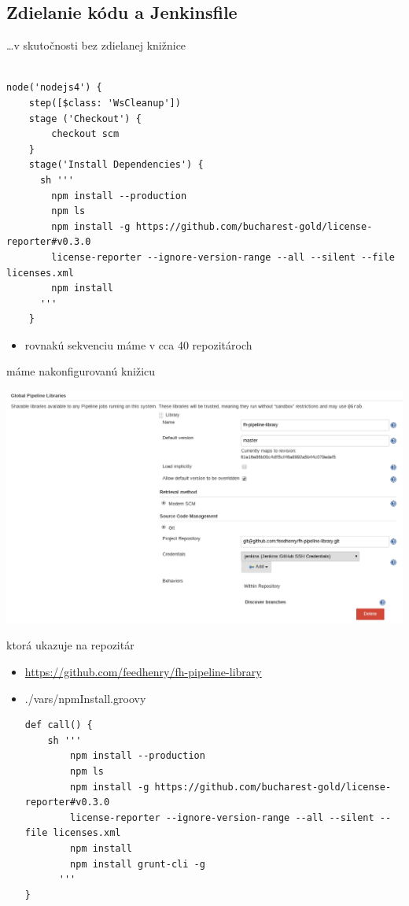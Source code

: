 \documentclass[bigger]{beamer}
\begin{document}
\subsection{Zdielanie kódu a Jenkinsfile}
\label{sec:orgc198fe6}
\begin{frame}[fragile,label={sec:org13c63e3}]{\ldots{}v skutočnosti bez zdielanej knižnice}
 \begin{verbatim}

node('nodejs4') {
    step([$class: 'WsCleanup'])
    stage ('Checkout') {
        checkout scm
    }
    stage('Install Dependencies') {
      sh '''
        npm install --production
        npm ls
        npm install -g https://github.com/bucharest-gold/license-reporter#v0.3.0
        license-reporter --ignore-version-range --all --silent --file licenses.xml
        npm install
      '''
    }

\end{verbatim}
\begin{itemize}
\item rovnakú sekvenciu máme v cca 40 repozitároch
\end{itemize}
\end{frame}

\begin{frame}[label={sec:orgdbbbb3c}]{máme nakonfigurovanú knižicu}
\begin{center}
\includegraphics[width=.9\linewidth]{./024pipeline_library.png}
\end{center}
\end{frame}

\begin{frame}[fragile,label={sec:orga0b3a77}]{ktorá ukazuje na repozitár}
 \begin{itemize}
\item \url{https://github.com/feedhenry/fh-pipeline-library}
\item ./vars/npmInstall.groovy
\begin{verbatim}
def call() {
    sh '''
        npm install --production
        npm ls
        npm install -g https://github.com/bucharest-gold/license-reporter#v0.3.0
        license-reporter --ignore-version-range --all --silent --file licenses.xml
        npm install
        npm install grunt-cli -g
      '''
}
\end{verbatim}
\end{itemize}
\end{frame}
\end{document}
